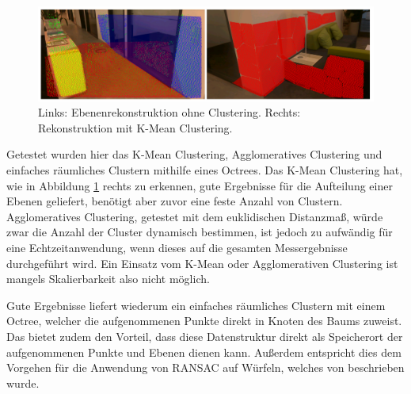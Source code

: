 \begin{figure}[h]
  \centering
	\includegraphics[width=1.0\textwidth]{content/images/methods/clustering.png} 
  \caption{Links: Ebenenrekonstruktion ohne Clustering. Rechts: Rekonstruktion mit K-Mean Clustering.}
  \label{fig:clustering}
\end{figure}

Getestet wurden hier das K-Mean Clustering, Agglomeratives Clustering und einfaches räumliches Clustern mithilfe eines Octrees. Das K-Mean Clustering hat, wie in Abbildung \ref{fig:clustering} rechts zu erkennen, gute Ergebnisse für die Aufteilung einer Ebenen geliefert, benötigt aber zuvor eine feste Anzahl von Clustern. Agglomeratives Clustering, getestet mit dem euklidischen Distanzmaß, würde zwar die Anzahl der Cluster dynamisch bestimmen, ist jedoch zu aufwändig für eine Echtzeitanwendung, wenn dieses auf die gesamten Messergebnisse durchgeführt wird. Ein Einsatz vom K-Mean oder Agglomerativen Clustering ist mangels Skalierbarkeit also nicht möglich.

Gute Ergebnisse liefert wiederum ein einfaches räumliches Clustern mit einem Octree, welcher die aufgenommenen Punkte direkt in Knoten des Baums zuweist. Das bietet zudem den Vorteil, dass diese Datenstruktur direkt als Speicherort der aufgenommenen Punkte und Ebenen dienen kann. Außerdem entspricht dies dem Vorgehen für die Anwendung von RANSAC auf Würfeln, welches von \citet{yang2010plane} beschrieben wurde. 
